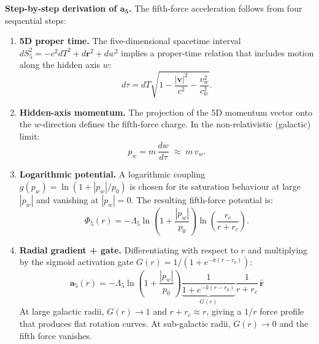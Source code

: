 \documentclass[11pt,a4paper]{article}
\newcommand{\pw}{p_w}                        %
\newcommand{\Lf}{\Lambda_5}                  %
\newcommand{\afive}{\mathbf{a}_5}            %
\newcommand{\rhat}{\hat{\mathbf{r}}}         %
\newcommand{\dS}{dS_5^2}                     %
\begin{document}
\vspace{1.2em}
\begin{center}
\begin{minipage}{0.88\textwidth}
\small
\textbf{Step-by-step derivation of $\boldsymbol{\mathbf{a}_5}$.}\quad
The fifth-force acceleration follows from four sequential steps:

\begin{enumerate}[leftmargin=1.8em,itemsep=4pt]

\item \textbf{5D proper time.}\enspace
  The five-dimensional spacetime interval $\dS = -c^2dT^2 + d\mathbf{r}^2 + dw^2$
  implies a proper-time relation that includes motion along the hidden axis $w$:
  \[
    d\tau = dT\sqrt{1 - \frac{|\mathbf{v}|^2}{c^2} - \frac{v_w^2}{c_w^2}} .
  \]

\item \textbf{Hidden-axis momentum.}\enspace
  The projection of the 5D momentum vector onto the $w$-direction defines the
  fifth-force charge.  In the non-relativistic (galactic) limit:
  \[
    \pw = m\,\frac{dw}{d\tau} \;\approx\; m\,v_w .
  \]

\item \textbf{Logarithmic potential.}\enspace
  A logarithmic coupling $g(\pw) = \ln(1+|\pw|/p_0)$ is chosen for its
  saturation behaviour at large $|\pw|$ and vanishing at $|\pw|=0$.
  The resulting fifth-force potential is:
  \[
    \Phi_5(r) = -\Lf \ln\!\left(1+\frac{|\pw|}{p_0}\right)
    \ln\!\left(\frac{r_c}{r + r_c}\right) .
  \]

\item \textbf{Radial gradient + gate.}\enspace
  Differentiating with respect to $r$ and multiplying by the sigmoid activation
  gate $G(r) = 1/(1+e^{-k(r-r_0)})$:
  \[
    \boxed{\,
      \afive(r) = -\Lf\ln\!\left(1+\frac{|\pw|}{p_0}\right)
      \underbrace{\frac{1}{1+e^{-k(r-r_0)}}}_{G(r)}
      \frac{1}{r+r_c}\,\rhat
    \,}
  \]
  At large galactic radii, $G(r)\to 1$ and $r+r_c \approx r$, giving a
  $1/r$ force profile that produces flat rotation curves.
  At sub-galactic radii, $G(r)\to 0$ and the fifth force vanishes.

\end{enumerate}
\end{minipage}
\end{center}

\newpage
\tableofcontents
\newpage
\end{document}
